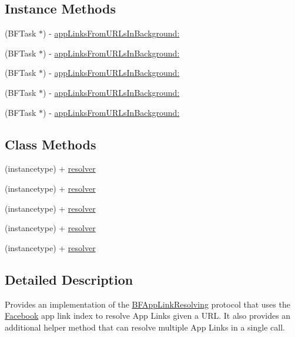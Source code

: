 \subsection*{Instance Methods}
\begin{DoxyCompactItemize}
\item 
(B\+F\+Task $\ast$) -\/ \hyperlink{interfaceFBAppLinkResolver_aefdaa81da8bc6105172f4f2632c12daa}{app\+Links\+From\+U\+R\+Ls\+In\+Background\+:}
\item 
(B\+F\+Task $\ast$) -\/ \hyperlink{interfaceFBAppLinkResolver_aefdaa81da8bc6105172f4f2632c12daa}{app\+Links\+From\+U\+R\+Ls\+In\+Background\+:}
\item 
(B\+F\+Task $\ast$) -\/ \hyperlink{interfaceFBAppLinkResolver_aefdaa81da8bc6105172f4f2632c12daa}{app\+Links\+From\+U\+R\+Ls\+In\+Background\+:}
\item 
(B\+F\+Task $\ast$) -\/ \hyperlink{interfaceFBAppLinkResolver_aefdaa81da8bc6105172f4f2632c12daa}{app\+Links\+From\+U\+R\+Ls\+In\+Background\+:}
\item 
(B\+F\+Task $\ast$) -\/ \hyperlink{interfaceFBAppLinkResolver_aefdaa81da8bc6105172f4f2632c12daa}{app\+Links\+From\+U\+R\+Ls\+In\+Background\+:}
\end{DoxyCompactItemize}
\subsection*{Class Methods}
\begin{DoxyCompactItemize}
\item 
(instancetype) + \hyperlink{interfaceFBAppLinkResolver_a2012888799cc3416e4c6d01e1a18f90b}{resolver}
\item 
(instancetype) + \hyperlink{interfaceFBAppLinkResolver_a2012888799cc3416e4c6d01e1a18f90b}{resolver}
\item 
(instancetype) + \hyperlink{interfaceFBAppLinkResolver_a2012888799cc3416e4c6d01e1a18f90b}{resolver}
\item 
(instancetype) + \hyperlink{interfaceFBAppLinkResolver_a2012888799cc3416e4c6d01e1a18f90b}{resolver}
\item 
(instancetype) + \hyperlink{interfaceFBAppLinkResolver_a2012888799cc3416e4c6d01e1a18f90b}{resolver}
\end{DoxyCompactItemize}


\subsection{Detailed Description}
Provides an implementation of the \hyperlink{classBFAppLinkResolving-p}{B\+F\+App\+Link\+Resolving} protocol that uses the \hyperlink{interfaceFacebook}{Facebook} app link index to resolve App Links given a U\+RL. It also provides an additional helper method that can resolve multiple App Links in a single call.

